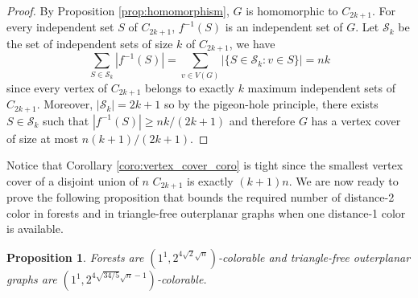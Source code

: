 \documentclass{article}
\newtheorem{proposition}[theorem]{Proposition}
\newcommand{\colo}[2]{(1^{#1}, 2^{#2})}
\begin{document}
\begin{proof}
    By Proposition \ref{prop:homomorphism}, $G$ is homomorphic to $C_{2k + 1}$. For every independent set $S$ of $C_{2k + 1}$, $f^{-1}(S)$ is an independent set of $G$. Let $\mathcal{S}_k$ be the set of independent sets of size $k$ of $C_{2k + 1}$, we have
    \[\sum_{S \in \mathcal{S}_k}|f^{-1}(S)| = \sum_{v \in V(G)} |\{S \in \mathcal{S}_k: v \in S\}| = nk\]
    since every vertex of $C_{2k + 1}$ belongs to exactly $k$ maximum independent sets of $C_{2k + 1}$. Moreover, $|\mathcal{S}_k| = 2k + 1$ so by the pigeon-hole principle, there exists $S \in \mathcal{S}_k$ such that $|f^{-1}(S)| \ge nk/(2k + 1)$ and therefore $G$ has a vertex cover of size at most $n(k + 1)/(2k + 1)$.  
\end{proof}

Notice that Corollary \ref{coro:vertex_cover_coro} is tight since the smallest vertex cover of a disjoint union of $n$ $C_{2k + 1}$ is exactly $(k + 1)n$. We are now ready to prove the following proposition that bounds the required number of distance-2 color in forests and in triangle-free outerplanar graphs when one distance-1 color is available.

\begin{proposition}\label{prop:upperbound_colo_for_forests_and_triangle-free_outerplanar_graphs}
    Forests are $\colo{1}{4\sqrt{2}\sqrt{n}}$-colorable and triangle-free outerplanar graphs are $\colo{1}{4\sqrt{34/5}\sqrt{n} - 1}$-colorable.
\end{proposition}
\end{document}
